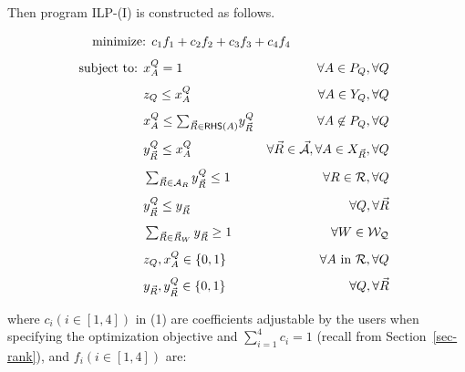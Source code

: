 {%

Then program ILP-(I) is constructed as follows.

\begin{tcolorbox}
  \begin{alignat}{2}
\hspace{-1.25cm}\text{minimize: } & c_{1}f_{1}+c_{2}f_{2}+c_{3}f_{3}+c_{4}f_{4}~~~~~~~~  &  
  \end{alignat} 
  \begin{alignat}{2}
   \hspace*{-0.15cm}\text{subject to: }&  x_{A}^{Q} = 1 & \forall
    A\in P_{Q}, \forall Q \\[0.8ex] 
    & z_{Q}\leq x_{A}^{Q} & \forall A \in Y_{Q},\forall Q \\[0.8ex]
    & x_{A}^{Q} \leq\textstyle \sum_{\kb{R}\in \RHS(A)}\!y_{\kb{R}}^{Q} &~\forall
    A\not\in P_{Q}, \forall Q \\[0.8ex]
    & y_{\kb{R}}^{Q} \leq x_{A}^{Q} & \forall \kb{R}\in \kb{\A}, \forall A\in X_{\kb{R}}, \forall
    Q\\[0.8ex]
    & \textstyle \sum_{\kb{R}\in \A_{R}} y_{\kb{R}}^{Q} \leq 1 & 
    \forall R\in \R, \forall Q \\[0.8ex]
    & y_{\kb{R}}^{Q} \leq y_{\kb{R}} & \forall Q, \forall \kb{R} \\[0.8ex]
    & \textstyle\sum_{\kb{R}\in \kb{R}_{W}} y_{\kb{R}} \geq 1 & \forall W\in \Wc_{\Q} \\[0.8ex]
    & z_{Q}, x_{A}^{Q} \in \{0, 1\} & \forall
    A\text{ in }\R, \forall Q\\[0.8ex]
    & y_{\kb{R}}, y_{\kb{R}}^{Q} \in \{0, 1\} & \forall Q, \forall
    \kb{R} 
  \end{alignat} 
\end{tcolorbox}

\sstab
where $c_{i} (i\in[1, 4])$  in (1) are coefficients adjustable by the users when specifying the
optimization objective and $\sum_{i=1}^{4}c_{i} = 1$ (recall
from Section~\ref{sec-rank}), and $f_{i}(i\in [1, 4])$ are:

\begin{tcolorbox}
\end{tcolorbox}

}
